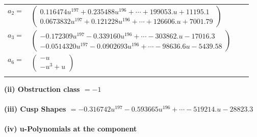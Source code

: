 \documentclass[1p]{elsarticle_modified}
\theoremstyle{definition}
\begin{document}
\begin{tabular}{m{7pt} m{180pt} m{7pt} m{180pt} }
\flushright $a_{2}=$&$\begin{pmatrix}0.116474 u^{197}+0.235488 u^{196}+\cdots+199053. u+11195.1\\0.0673832 u^{197}+0.121228 u^{196}+\cdots+126606. u+7001.79\end{pmatrix}$ \\
\flushright $a_{3}=$&$\begin{pmatrix}-0.172309 u^{197}-0.339160 u^{196}+\cdots-303862. u-17016.3\\-0.0514320 u^{197}-0.0902693 u^{196}+\cdots-98636.6 u-5439.58\end{pmatrix}$ \\
\flushright $a_{6}=$&$\begin{pmatrix}- u\\- u^3+u\end{pmatrix}$\\&\end{tabular}
\flushleft \textbf{(ii) Obstruction class $= -1$}\\~\\
\flushleft \textbf{(iii) Cusp Shapes $= -0.316742 u^{197}-0.593665 u^{196}+\cdots-519214. u-28823.3$}\\~\\
\newpage\renewcommand{\arraystretch}{1}
\flushleft \textbf{(iv) u-Polynomials at the component}\newline \\
\end{document}
